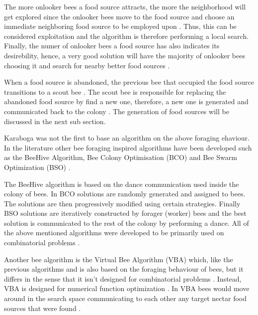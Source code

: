The more onlooker bees a food source attracts, the more the neighborhood will get explored since the onlooker bees move to the food source and choose an immediate neighboring food source to be employed upon \cite{ABCCompareStudy,ABCNumericalOptimization}. Thus, this can be considered exploitation and the algorithm is therefore performing a local search. Finally, the numer of onlooker bees a food source has also indicates its desirebility, hence, a very good solution will have the majority of onlooker bees choosing it and search for nearby better food sources \cite{ABCCompareStudy,ABCReconfigDistro,ABCNumericalOptimization}.

When a food source is abandoned, the previous bee that occupied the food source transitions to a scout bee \cite{ABCCompareStudy,ABCNumericalOptimization}. The scout bee is responsible for replacing the abandoned food source by find a new one, therefore, a new one is generated and communicated back to the colony \cite{ABCCompareStudy,ABCImageEnhancement,ABCNumericalOptimization}. The generation of food sources will be discussed in the next sub section.

Karaboga was not the first to base an algorithm on the above foraging ehaviour. In the literature other bee foraging inspired algorithms have been developed such as the BeeHive Algorithm, Bee Colony Optimisation (BCO) and Bee Swarm Optimization (BSO) \cite{BCO,HybridABCClustering,ABCNumericalOptimization}. 

The BeeHive algorithm is based on the dance communication used inside the colony of bees. In BCO solutions are randomly generated and assigned to bees\cite{HybridABCClustering,ABCNumericalOptimization}. The solutions are then progressively modified using certain strategies. Finally BSO solutions are iteratively constructed by forager (worker) bees and the best solution is communicated to the rest of the colony by performing a dance\cite{HybridABCClustering,ABCNumericalOptimization}. All of the above mentioned algorithms were developed to be primarily used on combinatorial problems \cite{ABCCompareStudy}.

Another bee algorithm is the Virtual Bee Algorithm (VBA) which, like the previous algorithms and is also based on the foraging behaviour of bees, but it differs in the sense that it isn't designed for combinatorial problems \cite{ABCNumericalOptimization}. Instead, VBA is designed for numerical function optimization \cite{ABCNumericalOptimization}. In VBA bees would move around in the search space communicating to each other any target nectar food sources that were found \cite{ABCNumericalOptimization}.

